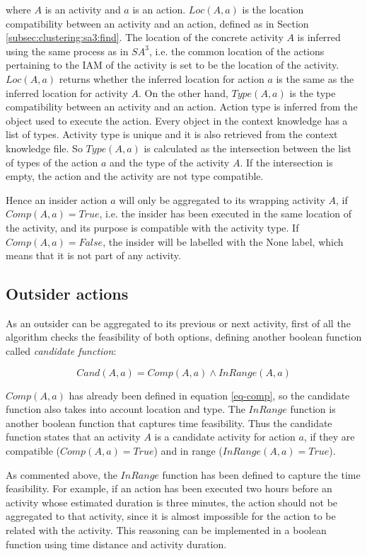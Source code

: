\noindent where $A$ is an activity and $a$ is an action. $Loc(A, a)$ is the location compatibility between an activity and an action, defined as in Section \ref{subsec:clustering:sa3:find}. The location of the concrete activity $A$ is inferred using the same process as in $SA^3$, i.e. the common location of the actions pertaining to the IAM of the activity is set to be the location of the activity. $Loc(A, a)$ returns whether the inferred location for action $a$ is the same as the inferred location for activity $A$. On the other hand, $Type(A, a)$ is the type compatibility between an activity and an action. Action type is inferred from the object used to execute the action. Every object in the context knowledge has a list of types. Activity type is unique and it is also retrieved from the context knowledge file. So $Type(A, a)$ is calculated as the intersection between the list of types of the action $a$ and the type of the activity $A$. If the intersection is empty, the action and the activity are not type compatible.

Hence an insider action $a$ will only be aggregated to its wrapping activity $A$, if $Comp(A, a) = True$, i.e. the insider has been executed in the same location of the activity, and its purpose is compatible with the activity type. If $Comp(A, a) = False$, the insider will be labelled with the None label, which means that it is not part of any activity.

\subsection{Outsider actions}
As an outsider can be aggregated to its previous or next activity, first of all the algorithm checks the feasibility of both options, defining another boolean function called \textit{candidate function}:

\begin{equation}
\label{eq-candidate}
 Cand(A, a) = Comp(A, a) \wedge InRange(A, a)
\end{equation}

\noindent $Comp(A, a)$ has already been defined in equation \ref{eq-comp}, so the candidate function also takes into account location and type. The $InRange$ function is another boolean function that captures time feasibility. Thus the candidate function states that an activity $A$ is a candidate activity for action $a$, if they are compatible ($Comp(A, a) = True$) and in range ($InRange(A, a) = True$). 

As commented above, the $InRange$ function has been defined to capture the time feasibility. For example, if an action has been executed two hours before an activity whose estimated duration is three minutes, the action should not be aggregated to that activity, since it is almost impossible for the action to be related with the activity. This reasoning can be implemented in a boolean function using time distance and activity duration.

